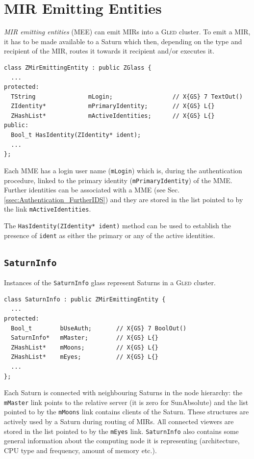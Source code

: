 \documentclass[a4paper,11pt]{article}
\def\gled{\textsc{Gled}\xspace}
\def\smalltt#1{{\small\texttt{#1}}}
\begin{document}

\section{MIR Emitting Entities}

\emph{MIR emitting entities} (MEE) can emit MIRs into a \gled cluster.
To emit a MIR, it has to be made available to a Saturn which then,
depending on the type and recipient of the MIR, routes it towards it
recipient and/or executes it.

{\footnotesize\begin{verbatim}
class ZMirEmittingEntity : public ZGlass {
  ...
protected:
  TString               mLogin;                 // X{GS} 7 TextOut()
  ZIdentity*            mPrimaryIdentity;       // X{GS} L{}
  ZHashList*            mActiveIdentities;      // X{GS} L{}
public:
  Bool_t HasIdentity(ZIdentity* ident);
  ...
};
\end{verbatim}
}

Each MME has a login user name (\smalltt{mLogin}) which is, during the
authentication procedure, linked to the primary identity
(\smalltt{mPrimaryIdentity}) of the MME. Further identities can be
associated with a MME (see Sec.\,\ref{ssec:Authentication_FurtherIDS}) and they are stored
in the list pointed to by the link \smalltt{mActiveIdentities}.

The \smalltt{HasIdentity(ZIdentity* ident)} method can be used to
establish the presence of \smalltt{ident} as either the primary or any
of the active identities.

\subsection{\smalltt{SaturnInfo}}

Instances of the \smalltt{SaturnInfo} glass represent Saturns in a
\gled cluster. 

{\footnotesize\begin{verbatim}
class SaturnInfo : public ZMirEmittingEntity {
  ...
protected:
  Bool_t        bUseAuth;       // X{GS} 7 BoolOut()
  SaturnInfo*   mMaster;        // X{GS} L{}
  ZHashList*    mMoons;         // X{GS} L{}
  ZHashList*    mEyes;          // X{GS} L{}
  ...
};
\end{verbatim}
}

Each Saturn is connected with neighbouring Saturns in the node
hierarchy: the \smalltt{mMaster} link points to the relative server
(it is zero for SunAbsolute) and the list pointed to by the
\smalltt{mMoons} link contains clients of the Saturn. These structures
are actively used by a Saturn during routing of MIRs. All connected
viewers are stored in the list pointed to by the \smalltt{mEyes} link.
\smalltt{SaturnInfo} also contains some general information about the
computing node it is representing (architecture, CPU type and frequency,
amount of memory etc.).
\end{document}
